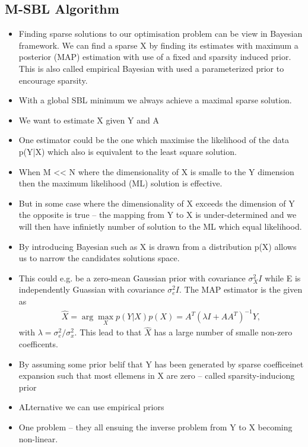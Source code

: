\subsection{M-SBL Algorithm}
\begin{itemize}
\item Finding sparse solutions to our optimisation problem can be view in Bayesian framework. We can find a sparse X by finding its estimates with maximum a posterior (MAP) estimation with use of a fixed and sparsity induced prior. This is also called empirical Bayesian with used a parameterized prior to encourage sparsity.
\item With a global SBL minimum we always achieve a maximal sparse solution.
\item We want to estimate X given Y and A
\item One estimator could be the one which maximise the likelihood of the data p(Y|X) which also is equivalent to the least square solution. 
\item When M << N where the dimensionality of X is smalle to the Y dimension then the maximum likelihood (ML) solution is effective.
\item But in some case where the dimensionality of X exceeds the dimension of Y the opposite is true -- the mapping from Y to X is under-determined and we will then have infinietly number of solution to the ML which equal likelihood.
\item By introducing Bayesian such as X is drawn from a distribution p(X) allows us to narrow the candidates solutions space.
\item This could e.g. be a zero-mean Gaussian prior with covariance $\sigma_X^2 I$ while E is independently Guassian with covariance $\sigma_e^2 I$. The MAP estimator is the given as
\begin{align*}
\hat{X} = \arg \max_X p(Y|X)p(X) = A^T (\lambda I + AA^T)^{-1} Y,
\end{align*}
with $\lambda = \sigma_e^2 / \sigma_x^2$. This lead to that $\hat{X}$ has a large number of smalle non-zero coefficents.
\item By assuming some prior belif that Y has been generated by sparse coefficeinet expansion such that most ellemens in X are zero -- called sparsity-induciong prior
\item ALternative we can use empirical priors
\item One problem -- they all ensuing the inverse problem from Y to X becoming non-linear.
\end{itemize}

